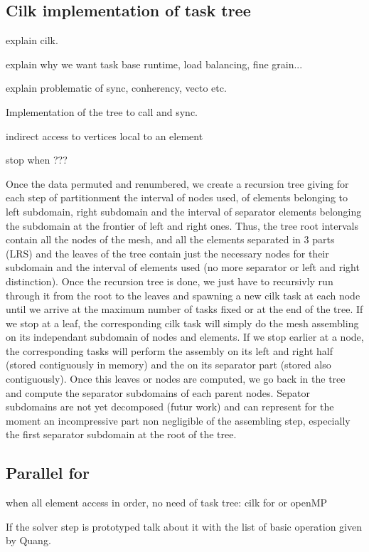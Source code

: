 \documentclass{IOS-Book-Article}
\begin{document}
\subsection{Cilk implementation of task tree}

explain cilk.

explain why we want task base runtime, load balancing, fine grain...

explain problematic of sync, conherency, vecto etc.


Implementation of the tree to call and sync.

indirect access to vertices local to an element

stop when ???

Once the data permuted and renumbered, we create a recursion tree giving for each step of partitionment the interval of nodes used, of elements belonging to left subdomain,
right subdomain and the interval of separator elements belonging the subdomain at the frontier of left and right ones.
Thus, the tree root intervals contain all  the nodes of the mesh, and all the elements separated in 3 parts (LRS) and the leaves of the tree contain just the necessary nodes
for their subdomain and the interval of elements used (no more separator or left and right distinction).
Once the recursion tree is done, we just have to recursivly run through it from the root to the leaves and spawning a new cilk task at each node until we arrive at the maximum
number of tasks fixed or at the end of the tree. If we stop at a leaf, the corresponding cilk task will simply do the mesh assembling on its independant subdomain of nodes and
elements. If we stop earlier at a node, the corresponding tasks will perform the assembly on its left and right half (stored contiguously in memory) and the on its separator
part (stored also contiguously). Once this leaves or nodes are computed, we go back in the tree and compute the separator subdomains of each parent nodes.
Sepator subdomains are not yet decomposed (futur work) and can represent for the moment an incompressive part non negligible of the assembling step, especially the first
separator subdomain at the root of the tree.

\subsection{Parallel for}

when all element access in order, no need of task tree: cilk for or openMP

If the solver step is prototyped talk about it with the list of basic operation given by Quang.
\end{document}
